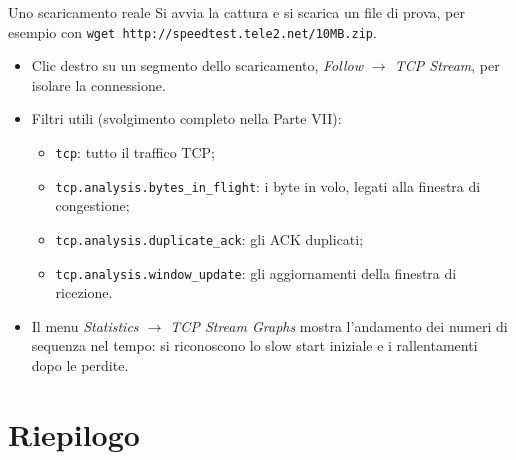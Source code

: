 \begin{esercizio}{Uno scaricamento reale}
Si avvia la cattura e si scarica un file di prova, per esempio con
\texttt{wget http://speedtest.tele2.net/10MB.zip}.
\begin{itemize}
    \item Clic destro su un segmento dello scaricamento, \emph{Follow $\rightarrow$ TCP Stream}, per isolare la connessione.
    \item Filtri utili (svolgimento completo nella Parte VII):
          \begin{itemize}
            \item \texttt{tcp}: tutto il traffico TCP;
            \item \texttt{tcp.analysis.bytes\_in\_flight}: i byte in volo, legati alla finestra di congestione;
            \item \texttt{tcp.analysis.duplicate\_ack}: gli ACK duplicati;
            \item \texttt{tcp.analysis.window\_update}: gli aggiornamenti della finestra di ricezione.
          \end{itemize}
    \item Il menu \emph{Statistics $\rightarrow$ TCP Stream Graphs} mostra l'andamento dei numeri di sequenza nel tempo:
          si riconoscono lo slow start iniziale e i rallentamenti dopo le perdite.
\end{itemize}
\end{esercizio}

\section{Riepilogo}

